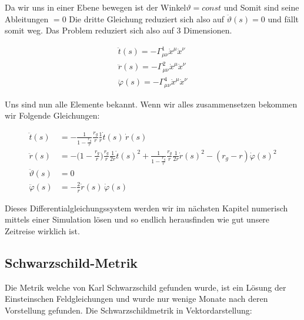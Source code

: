 \begin{refsection}
	Da wir uns in einer Ebene bewegen ist der Winkel$\vartheta = const$ und Somit sind seine Ableitungen $=0$ Die dritte Gleichung reduziert sich also auf $\ddot{\vartheta}(s)=0$ und fällt somit weg. Das Problem reduziert sich also auf 3 Dimensionen.
	
	\begin{align*}
	\ddot{t}(s) = -\Gamma^{1}_{\mu\nu}\dot{x}^{\mu}\dot{x}^{\nu}\\
	\ddot{r}(s) = -\Gamma^{2}_{\mu\nu}\dot{x}^{\mu}\dot{x}^{\nu}\\
	\ddot{\varphi}(s) = -\Gamma^{4}_{\mu\nu}\dot{x}^{\mu}\dot{x}^{\nu}		
	\end{align*}
	
	Uns sind nun alle Elemente bekannt. Wenn wir alles zusammensetzen bekommen wir Folgende Gleichungen:
	
	\begin{align*}
	\ddot t(s)
	&=
	-\frac{1}{1-\displaystyle\frac{r_g}{r}}\frac{r_g}{r}\frac{1}{r}\dot t(s)\,\dot r(s)
	\\
	\ddot r(s)
	&=
	-\biggl(1-\frac{r_g}{r}\biggr)\frac{r_g}{r}\frac1{2r}\dot t(s)^2
	+\frac{1}{1-\displaystyle\frac{r_g}{r}} \frac{r_g}{r}\frac1{2r}\dot r(s)^2
	- (r_g-r) \dot\varphi(s)^2
	\\
	\ddot \vartheta(s)
	&=
	0
	\\
	\ddot \varphi(s)
	&=
	-\frac2r \dot r(s)\,\dot\varphi(s)
	\end{align*}
	
	Dieses Differentialgleichungssystem werden wir im nächsten Kapitel numerisch mittels einer Simulation lösen und so endlich herausfinden wie gut unsere Zeitreise wirklich ist. 
	
	\subsection{Schwarzschild-Metrik}
	
	Die Metrik welche von Karl Schwarzschild gefunden wurde, ist ein Lösung der Einsteinschen Feldgleichungen und wurde nur wenige Monate nach deren Vorstellung gefunden.
	Die Schwarzschildmetrik in Vektordarstellung:
	

\end{refsection}
